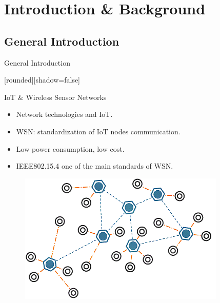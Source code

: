\section{Introduction \& Background}

\subsection{General Introduction}
\begin{withoutheadline}
\addtocounter{framenumber}{-1}
\begin{frame}{ General Introduction}


[rounded][shadow=false]

\begin{block}{ IoT \& Wireless Sensor Networks}
    \begin{itemize}
    \item Network technologies and IoT. 
    \item<2-> WSN: standardization of IoT nodes communication.
    \item<3-> Low power consumption, low cost.
    \item<4->  IEEE802.15.4 one of the main standards of WSN. 
    \end{itemize}
    \end{block}

 \begin{figure}[p]

\includegraphics[width=0.5\linewidth]{figures/wsn.png}
  
\end{figure}

\end{frame}
\end{withoutheadline}

